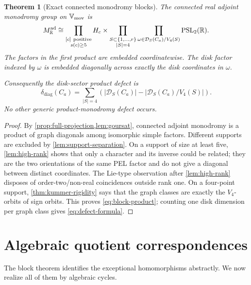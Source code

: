 \documentclass[11pt]{article}
\newtheorem{theorem}{Theorem}[section]
\theoremstyle{definition}
\theoremstyle{remark}
\newcommand{\R}{\mathbb R}
\newcommand{\PSL}{\operatorname{PSL}}
\newcommand{\diagdef}{\delta_{\mathrm{diag}}}
\begin{document}
\begin{theorem}[Exact connected monodromy blocks]\label{thm:exact-blocks}
The connected real adjoint monodromy group on $\mathbb V_{\rm mov}$ is
\begin{equation}\label{eq:block-product}
 M^{\rm ad}_{\R}\cong
 \prod_{\substack{[c]\ \mathrm{positive}\\s(c)\ge5}} H_c
 \times
 \prod_{\substack{S\subset\{1,\ldots,r\}\\|S|=4}}
 \prod_{\omega\in\mathcal D_S(C_a)/V_4(S)}\PSL_2(\R).
\end{equation}
The factors in the first product are embedded coordinatewise.  The disk factor indexed by $\omega$ is embedded diagonally across exactly the disk coordinates in $\omega$.

Consequently the disk-sector product defect is
\begin{equation}\label{eq:defect-formula}
 \boxed{
 \diagdef(C_a)=
 \sum_{|S|=4}
 \left(|\mathcal D_S(C_a)|-
       |\mathcal D_S(C_a)/V_4(S)|\right).}
\end{equation}
No other generic product-monodromy defect occurs.
\end{theorem}

\begin{proof}
By \cref{prop:full-projection,lem:goursat}, connected adjoint monodromy is a product of graph diagonals among isomorphic simple factors.  Different supports are excluded by \cref{lem:support-separation}.  On a support of size at least five, \cref{lem:high-rank} shows that only a character and its inverse could be related; they are the two orientations of the same PEL factor and do not give a diagonal between distinct coordinates.  The Lie-type observation after \cref{lem:high-rank} disposes of order-two/non-real coincidences outside rank one.  On a four-point support, \cref{thm:kummer-rigidity} says that the graph classes are exactly the $V_4$-orbits of sign orbits.  This proves \eqref{eq:block-product}; counting one disk dimension per graph class gives \eqref{eq:defect-formula}.
\end{proof}

\section{Algebraic quotient correspondences}

The block theorem identifies the exceptional homomorphisms abstractly.  We now realize all of them by algebraic cycles.
\end{document}
